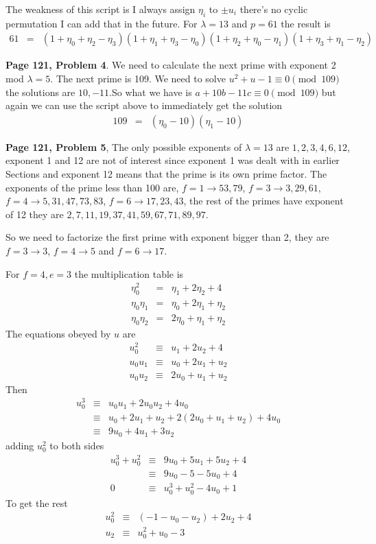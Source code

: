 \documentclass[aps,preprint,preprintnumbers,nofootinbib,showpacs,prd]{revtex4-1}
\newcommand{\nbea}{\begin{eqnarray*}}
\newcommand{\neea}{\end{eqnarray*}}
\begin{document}
%
The weakness of this script is I always assign $\eta_i$ to $\pm u_i$ there's no cyclic permutation I can add that in the future. For  $\lambda = 13$ and $p = 61$ the result is
%
\nbea
61 & = & (1 + \eta_0 + \eta_2 - \eta_3)(1 + \eta_1 + \eta_3 - \eta_0)(1 + \eta_2 + \eta_0 - \eta_1)(1 + \eta_3 + \eta_1 - \eta_2)
\neea
%

{\bf Page 121, Problem 4}. We need to calculate the next prime with exponent 2 mod $\lambda=5$. The next prime is 109. We need to solve $u^2 + u - 1 \equiv 0 \pmod{109}$ the solutions are $10, -11$.So what we have is $a + 10b - 11c \equiv 0 \pmod{109}$ but again we can use the script above to immediately get the solution
%
\nbea
109 & = & (\eta_0 - 10)(\eta_1 - 10)
\neea
%

{\bf Page 121, Problem 5}, The only possible exponents of $\lambda = 13$ are $1,2,3,4,6,12$, exponent 1 and 12 are not of interest since exponent 1 was dealt with in earlier Sections and exponent 12 means that the prime is its own prime factor. The exponents of the prime less than 100 are, $f = 1 \to 53, 79$, $f = 3 \to 3, 29, 61$, $f = 4 \to 5, 31, 47, 73, 83$, $f = 6 \to 17, 23, 43$, the rest of the primes have exponent of 12 they are $2, 7, 11, 19, 37, 41, 59, 67, 71, 89, 97$.

So we need to factorize the first prime with exponent bigger than 2, they are $f = 3 \to 3$, $f = 4 \to 5$ and $f = 6 \to 17$.

For $f = 4, e = 3$ the multiplication table is
%
\nbea
\eta_0^2 & = & \eta_1 + 2\eta_2 + 4 \\
\eta_0\eta_1 & = & \eta_0 + 2\eta_1 + \eta_2 \\
\eta_0\eta_2 & = & 2\eta_0 + \eta_1 + \eta_2
\neea
%
The equations obeyed by $u$ are
%
\nbea
u_0^2 & \equiv & u_1 + 2u_2 + 4 \\
u_0u_1 & \equiv & u_0 + 2u_1 + u_2 \\
u_0u_2 & \equiv & 2u_0 + u_1 + u_2
\neea
%
Then
%
\nbea
u_0^3 & \equiv & u_0u_1 + 2u_0u_2 + 4u_0 \\
& \equiv & u_0 + 2u_1 + u_2 + 2(2u_0 + u_1 + u_2) + 4u_0 \\
& \equiv & 9u_0 + 4u_1 + 3u_2
\neea
%
adding $u_0^2$ to both sides
%
\nbea
u_0^3 + u_0^2 & \equiv & 9u_0 + 5u_1 + 5u_2 + 4 \\
& \equiv & 9u_0 - 5 - 5 u_0 + 4 \\
0 & \equiv & u_0^3 + u_0^2  - 4u_0 + 1
\neea
%
To get the rest
%
\nbea
u_0^2 & \equiv & (-1 - u_0 - u_2) + 2u_2 + 4 \\
u_2 & \equiv & u_0^2 + u_0 - 3
\neea
%
\end{document}
